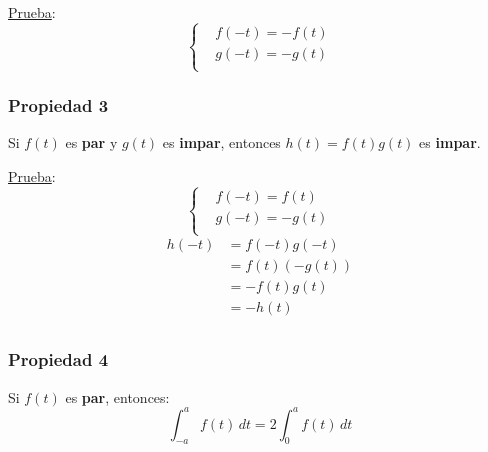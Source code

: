 \underline{Prueba}:
\begin{equation*}
\begin{cases}
    &f(-t)=-f(t)\\
    &g(-t)=-g(t)\\
\end{cases}
\end{equation*}

\subsubsection*{Propiedad 3}
Si $f(t)$ es \textbf{par} y $g(t)$ es \textbf{impar}, entonces $h(t)=f(t)g(t)$
es \textbf{impar}.

\underline{Prueba}:
\begin{equation*}
\begin{cases}
    &f(-t)=f(t)\\
    &g(-t)=-g(t)\\
\end{cases}
\end{equation*}
\begin{equation*}
\begin{split}
    h(-t)
        &=f(-t)g(-t)\\
        &=f(t)(-g(t))\\
        &=-f(t)g(t)\\
        &=-h(t)\\
\end{split}
\end{equation*}

\subsubsection*{Propiedad 4}
Si $f(t)$ es \textbf{par}, entonces:
\begin{equation}
    \int_{-a}^a f(t)\,dt=2\int_0^a f(t)\,dt
\end{equation}
\begin{figure}[H]
    \centering
    
\end{figure}

